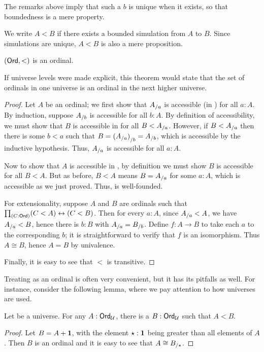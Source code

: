 The remarks above imply that such a $b$ is unique when it exists, so that boundedness is a mere property.

We write $A<B$ if there exists a bounded simulation from $A$ to $B$.
Since simulations are unique, $A<B$ is also a mere proposition.

\begin{thm}\label{thm:ordord}
  $(\mathsf{Ord},<)$ is an ordinal.
\end{thm}

\begin{rmk}
  If universe levels were made explicit, this theorem would state that the set of ordinals in one universe is an ordinal in the next higher universe.
\end{rmk}

\begin{proof}
  Let $A$ be an ordinal; we first show that ${A}_{/a}$ is accessible (in \ord) for all $a:A$.
  By induction, suppose ${A}_{/b}$ is accessible for all $b:A$.
  By definition of accessibility, we must show that $B$ is accessible in \ord for all $B<{A}_{/a}$.
  However, if $B<{A}_{/a}$ then there is some $b<a$ such that $B = {({A}_{/a})}_{/b} = {A}_{/b}$, which is accessible by the inductive hypothesis.
  Thus, ${A}_{/a}$ is accessible for all $a:A$.

  Now to show that $A$ is accessible in \ord, by definition we must show $B$ is accessible for all $B<A$.
  But as before, $B<A$ means $B={A}_{/a}$ for some $a:A$, which is accessible as we just proved.
  Thus, \ord is well-founded.

  For extensionality, suppose $A$ and $B$ are ordinals such that $\prd{C:\ord} (C<A) \leftrightarrow (C<B)$.
  Then for every $a:A$, since ${A}_{/a}<A$, we have ${A}_{/a}<B$, hence there is $b:B$ with ${A}_{/a} = {B}_{/b}$.
  Define $f:A\to B$ to take each $a$ to the corresponding $b$; it is straightforward to verify that $f$ is an isomorphism.
  Thus $A\cong B$, hence $A=B$ by univalence.

  Finally, it is easy to see that $<$ is transitive.
\end{proof}

Treating \ord as an ordinal is often very convenient, but it has its pitfalls as well.
For instance, consider the following lemma, where we pay attention to how universes are used.

\begin{lem}\label{thm:ordsucc}
  Let \bbU be a universe.
  For any $A:\mathsf{Ord}_\mathcal{U}$, there is a $B:\mathsf{Ord}_\mathcal{U}$ such that $A<B$.
\end{lem}
\begin{proof}
  Let $B=A+\mathbf{1}$, with the element $\star:\mathbf{1}$ being greater than all elements of $A$.
  Then $B$ is an ordinal and it is easy to see that $A\cong {B}_{/\star}$.
\end{proof}

